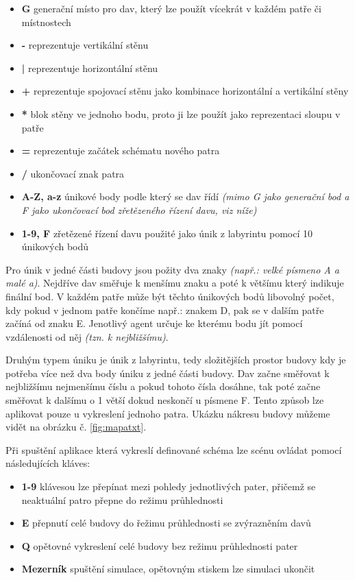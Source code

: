 \documentclass[czech,public,dept460,male,cpdeclaration]{diploma}
\begin{document}
\begin{itemize}
	\item \textbf{G} generační místo pro dav, který lze použít vícekrát v každém patře či místnostech
	\item \textbf{-} reprezentuje vertikální stěnu
	\item \textbf{|} reprezentuje horizontální stěnu
	\item \textbf{+} reprezentuje spojovací stěnu jako kombinace horizontální a vertikální stěny
	\item \textbf{*} blok stěny ve jednoho bodu, proto ji lze použít jako reprezentaci sloupu v patře
	\item \textbf{=} reprezentuje začátek schématu nového patra
	\item \textbf{/} ukončovací znak patra
	\item \textbf{A-Z, a-z} únikové body podle který se dav řídí \textit{(mimo G jako generační bod a F jako ukončovací bod zřetězeného řízení davu, viz níže)}
	\item \textbf{1-9, F} zřetězené řízení davu použité jako únik z labyrintu pomocí 10 únikových bodů
\end{itemize}

Pro únik v jedné části budovy jsou požity dva znaky \textit{(např.: velké  písmeno A a malé a)}. Nejdříve dav směřuje k menšímu znaku a poté k většímu který indikuje finální bod. V každém patře může být těchto únikových bodů libovolný počet, kdy pokud v jednom patře končíme např.: znakem D, pak se v dalším patře začíná od znaku E. Jenotlivý agent určuje ke kterému bodu jít pomocí vzdálenosti od něj \textit{(tzn. k nejbližšímu)}.

Druhým typem úniku je únik z labyrintu, tedy složitějších prostor budovy kdy je potřeba více než dva body úniku z jedné části budovy. Dav začne směřovat k nejbližšímu nejmenšímu číslu a pokud tohoto čísla dosáhne, tak poté začne směřovat k dalšímu o 1 větší dokud neskončí u písmene F. Tento způsob lze aplikovat pouze u vykreslení jednoho patra. Ukázku nákresu budovy můžeme vidět na obrázku č.  \ref{fig:mapatxt}.

Při spuštění aplikace která vykreslí definované schéma lze scénu ovládat pomocí následujících kláves:

\begin{itemize}
	\item \textbf{1-9} klávesou lze přepínat mezi pohledy jednotlivých pater, přičemž se neaktuální patro přepne do režimu průhlednosti
	\item \textbf{E} přepnutí celé budovy do řežimu průhlednosti se zvýrazněním davů
	\item \textbf{Q} opětovné vykreslení celé budovy bez režimu průhlednosti pater
	\item \textbf{Mezerník} spuštění simulace, opětovným stiskem lze simulaci ukončit
\end{itemize}
\end{document}
